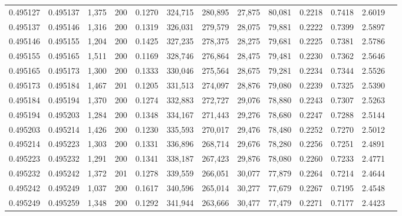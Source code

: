 \begin{tabular}{rrrrrrrrrrrrr}
0.495127 & 0.495137 & 1,375 & 200 &                                     0.1270 & 324,715 & 280,895 &  27,875 &  80,081 & 0.2218 & 0.7418 & 2.6019 \\
0.495137 & 0.495146 & 1,316 & 200 &                                     0.1319 & 326,031 & 279,579 &  28,075 &  79,881 & 0.2222 & 0.7399 & 2.5897 \\
0.495146 & 0.495155 & 1,204 & 200 &                                     0.1425 & 327,235 & 278,375 &  28,275 &  79,681 & 0.2225 & 0.7381 & 2.5786 \\
0.495155 & 0.495165 & 1,511 & 200 &                                     0.1169 & 328,746 & 276,864 &  28,475 &  79,481 & 0.2230 & 0.7362 & 2.5646 \\
0.495165 & 0.495173 & 1,300 & 200 &                                     0.1333 & 330,046 & 275,564 &  28,675 &  79,281 & 0.2234 & 0.7344 & 2.5526 \\
0.495173 & 0.495184 & 1,467 & 201 &                                     0.1205 & 331,513 & 274,097 &  28,876 &  79,080 & 0.2239 & 0.7325 & 2.5390 \\
0.495184 & 0.495194 & 1,370 & 200 &                                     0.1274 & 332,883 & 272,727 &  29,076 &  78,880 & 0.2243 & 0.7307 & 2.5263 \\
0.495194 & 0.495203 & 1,284 & 200 &                                     0.1348 & 334,167 & 271,443 &  29,276 &  78,680 & 0.2247 & 0.7288 & 2.5144 \\
0.495203 & 0.495214 & 1,426 & 200 &                                     0.1230 & 335,593 & 270,017 &  29,476 &  78,480 & 0.2252 & 0.7270 & 2.5012 \\
0.495214 & 0.495223 & 1,303 & 200 &                                     0.1331 & 336,896 & 268,714 &  29,676 &  78,280 & 0.2256 & 0.7251 & 2.4891 \\
0.495223 & 0.495232 & 1,291 & 200 &                                     0.1341 & 338,187 & 267,423 &  29,876 &  78,080 & 0.2260 & 0.7233 & 2.4771 \\
0.495232 & 0.495242 & 1,372 & 201 &                                     0.1278 & 339,559 & 266,051 &  30,077 &  77,879 & 0.2264 & 0.7214 & 2.4644 \\
0.495242 & 0.495249 & 1,037 & 200 &                                     0.1617 & 340,596 & 265,014 &  30,277 &  77,679 & 0.2267 & 0.7195 & 2.4548 \\
0.495249 & 0.495259 & 1,348 & 200 &                                     0.1292 & 341,944 & 263,666 &  30,477 &  77,479 & 0.2271 & 0.7177 & 2.4423 \\

\end{tabular}
